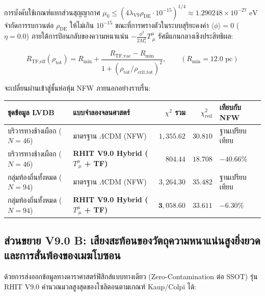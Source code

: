 \documentclass[11pt, a4paper]{article}
\begin{document}
การบังคับใช้เกณฑ์แยกส่วนสุญญากาศ $\mu_0 \le (4\lambda_{\text{V9}}\rho_{\text{DE}}\cdot 10^{-15})^{1/4} \approx 1.290248 \times 10^{-27}\text{ eV}$ จำกัดการรบกวนต่อ $\rho_{\text{DE}}$ ให้ไม่เกิน $10^{-15}$ ขณะที่การพรางตัวในระบบสุริยะคงค่า $\langle\phi\rangle = 0$ ($\eta = 0.0$) ภายใต้การป้อนกลับของความหนาแน่น $-\frac{\phi^2}{2M_s^2}T^\mu_{\ \mu}$ รัศมีแกนกลางเชิงประสิทธิผล:

\begin{equation}
R_{\text{TF,eff}}(\rho_{\text{tot}}) = R_{\text{min}} + \frac{R_{\text{TF,vac}} - R_{\text{min}}}{1 + (\rho_{\text{tot}}/\rho_{\text{crit,tot}})^2}, \qquad (R_{\text{min}} = 12.0\text{ pc})
\end{equation}

จะเปลี่ยนผ่านเข้าสู่ชั้นห่อหุ้ม NFW ภายนอกอย่างราบรื่น:

\begin{center}
{\small
\setlength{\tabcolsep}{4.5pt}
\begin{tabular}{p{4.6cm} p{4.2cm} r r p{2.8cm}}
\toprule
\textbf{ชุดข้อมูล LVDB} & \textbf{แบบจำลองจลนศาสตร์} & \textbf{$\chi^2$ รวม} & \textbf{$\chi^2_{\text{red}}$} & \textbf{เทียบกับ NFW} \\
\midrule
บริวารทางช้างเผือก ($N = 46$) & มาตรฐาน $\Lambda\text{CDM}$ (NFW) & $1,355.62$ & $30.810$ & ฐานเปรียบเทียบ \\
\rowcolor{rowtint}
บริวารทางช้างเผือก ($N = 46$) & \textbf{RHIT V9.0 Hybrid ($T^\mu_{\ \mu}$ + TF)} & $\mathbf{804.44}$ & $\mathbf{18.708}$ & $\mathbf{-40.66\%}$ \\
\midrule
กลุ่มท้องถิ่นทั้งหมด ($N = 94$) & มาตรฐาน $\Lambda\text{CDM}$ (NFW) & $3,264.30$ & $35.482$ & ฐานเปรียบเทียบ \\
\rowcolor{rowtint}
กลุ่มท้องถิ่นทั้งหมด ($N = 94$) & \textbf{RHIT V9.0 Hybrid ($T^\mu_{\ \mu}$ + TF)} & $\mathbf{3,058.60}$ & $\mathbf{33.611}$ & $\mathbf{-6.30\%}$ \\
\bottomrule
\end{tabular}
}
\end{center}

\subsection{ส่วนขยาย V9.0 B: เสียงสะท้อนของวัตถุความหนาแน่นสูงยิ่งยวดและการสั่นพ้องของเมฆโบซอน}

ด้วยการส่งออกข้อมูลทางดาราศาสตร์ฟิสิกส์แบบทางเดียว (Zero-Contamination ต่อ SSOT) รุ่น RHIT V9.0 คำนวณมวลสูงสุดของโซลิตอนตามเกณฑ์ Kaup/Colpi ได้:
\end{document}
